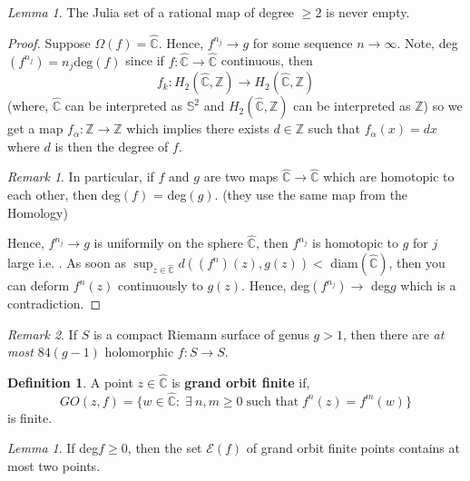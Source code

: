 \documentclass[a4paper, 11pt]{book}
\theoremstyle{definition}
\newtheorem{definition}{Definition}[section]
\theoremstyle{remark}
\newtheorem*{remark}{Remark}
\newtheorem{lemma}[theorem]{Lemma}
\begin{document}
    \begin{lemma}
        The Julia set of a rational map of degree $\geq 2$ is never empty.
    \end{lemma}
    \begin{proof}
        Suppose $\Omega(f) = \hat{\mathbb{C}}$. Hence, $f^{n_j}\to g$ for some sequence $n\to\infty$. Note, deg$(f^{n_j}) = n_j\text{deg}(f)$ since
        if $f:\hat{\mathbb{C}}\to\hat{\mathbb{C}}$ continuous, then 
        \[ f_k: H_2(\hat{\mathbb{C}},\mathbb{Z}) \to H_2(\hat{\mathbb{C}},\mathbb{Z}) \]
        (where, $\hat{\mathbb{C}}$ can be interpreted as $\mathbb{S}^2$ and $H_2(\hat{\mathbb{C}},\mathbb{Z})$ can be interpreted as $\mathbb{Z}$)
        so we get a map $f_{\alpha}:\mathbb{Z}\to\mathbb{Z}$ which implies there exists $d\in\mathbb{Z}$ such that $f_{\alpha}(x) = dx$ where
        $d$ is then the degree of $f$.
        \begin{remark}
            In particular, if $f$ and $g$ are two maps $\hat{\mathbb{C}}\to\hat{\mathbb{C}}$ which are homotopic to each other, then
            deg$(f)$ = deg$(g)$. (they use the same map from the Homology)
        \end{remark}
        Hence, $f^{n_j}\to g$ is uniformily on the sphere $\hat{\mathbb{C}}$, then $f^{n_j}$ is homotopic to $g$ for $j$ large i.e.
        . As soon as $\sup_{z\in\hat{\mathbb{C}}} d((f^n)(z),g(z))<$ diam$(\hat{\mathbb{C}})$, then you can
        deform $f^n(z)$ continuously to $g(z)$. Hence, deg$(f^{n_j})\to$ deg$g$ which is a contradiction.
    \end{proof}

    \begin{remark}
        If $S$ is a compact Riemann surface of genus $g>1$, then there are \textit{at most} $84(g-1)$ holomorphic $f:S\to S$.
    \end{remark}

    \begin{definition}
        A point $z\in\hat{\mathbb{C}}$ is \textbf{grand orbit finite} if,
        \[ GO(z,f) = \{w\in\hat{\mathbb{C}}:\;\exists\:n,m\geq 0\;\text{such that}\;f^n(z) = f^m(w)\} \]
        is finite.
    \end{definition}

    \begin{lemma}
        If deg$f\geq 0$, then the set $\mathcal{E}(f)$ of grand orbit finite points contains at most two points.
    \end{lemma}
\end{document}
